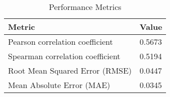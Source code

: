 \documentclass{article}
\begin{document}
\begin{table}[h!]
\centering
\begin{tabular}{ll}
\toprule
Metric & Value \\
\midrule
Pearson correlation coefficient & 0.5673 \\
Spearman correlation coefficient & 0.5194 \\
Root Mean Squared Error (RMSE) & 0.0447 \\
Mean Absolute Error (MAE) & 0.0345 \\
\bottomrule
\end{tabular}
\caption{Performance Metrics}
\label{tab:metrics}
\end{table}
\end{document}
